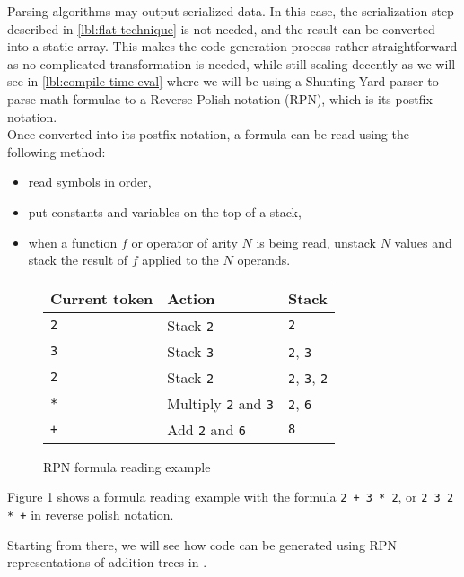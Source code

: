 \documentclass[../main]{subfiles}
\begin{document}
Parsing algorithms may output serialized data. In this case, the serialization
step described in \ref{lbl:flat-technique} is not needed, and the result
can be converted into a static array.
This makes the code generation process rather straightforward as no complicated
transformation is needed, while still scaling decently as we will see in
\ref{lbl:compile-time-eval} where we will be using a
Shunting Yard parser \cite{shunting-yard} to parse math formulae to a
Reverse Polish notation (RPN), which is its postfix notation.
\\

Once converted into its postfix notation,
a formula can be read using the following method:

\begin{itemize}
\item read symbols in order,
\item put constants and variables on the top of a stack,
\item when a function $f$ or operator of arity $N$ is being read,
      unstack $N$ values and stack the result of $f$ applied
      to the $N$ operands.
\end{itemize}

\begin{figure}
\begin{tabular}{|l|l|l|}
\hline
Current token & Action & Stack \\
\hline
\lstinline|2| & Stack \lstinline|2| & \lstinline|2| \\
\lstinline|3| & Stack \lstinline|3| & \lstinline|2|, \lstinline|3| \\
\lstinline|2| & Stack \lstinline|2| & \lstinline|2|, \lstinline|3|, \lstinline|2| \\
\lstinline|*| & Multiply \lstinline|2| and \lstinline|3| & \lstinline|2|, \lstinline|6| \\
\lstinline|+| & Add \lstinline|2| and \lstinline|6| & \lstinline|8| \\
\hline
\end{tabular}
\caption{RPN formula reading example}
\label{fig:rpn-reading-example}
\end{figure}

Figure \ref{fig:rpn-reading-example} shows a formula reading example with
the formula \lstinline{2 + 3 * 2}, or \lstinline{2 3 2 * +} in
reverse polish notation.

Starting from there, we will see how code can be generated using
RPN representations of addition trees in \cpp.
\end{document}
